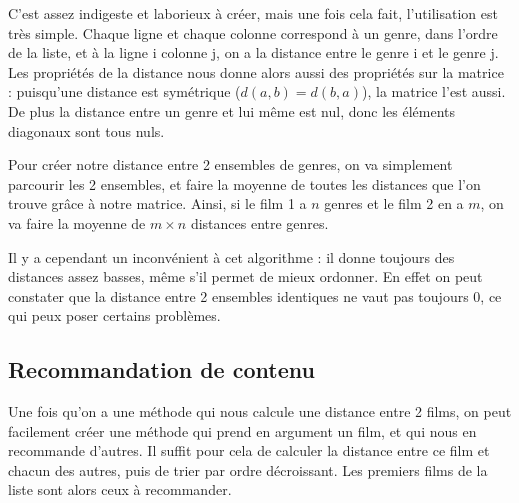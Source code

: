 \documentclass{report}
\begin{document}
\normalsize
C'est assez indigeste et laborieux à créer, mais une fois cela fait, l'utilisation est très simple. Chaque ligne et chaque colonne correspond à un genre, dans l'ordre de la liste, et à la ligne i colonne j, on a la distance entre le genre i et le genre j. Les propriétés de la distance nous donne alors aussi des propriétés sur la matrice : puisqu'une distance est symétrique (\(d(a,b)=d(b,a)\)), la matrice l'est aussi. De plus la distance entre un genre et lui même est nul, donc les éléments diagonaux sont tous nuls.\par
Pour créer notre distance entre 2 ensembles de genres, on va simplement parcourir les 2 ensembles, et faire la moyenne de toutes les distances que l'on trouve grâce à notre matrice. Ainsi, si le film 1 a $n$ genres et le film 2 en a $m$, on va faire la moyenne de $m\times n$ distances entre genres.\par
Il y a cependant un inconvénient à cet algorithme : il donne toujours des distances assez basses, même s'il permet de mieux ordonner. En effet on peut constater que la distance entre 2 ensembles identiques ne vaut pas toujours 0, ce qui peux poser certains problèmes.

\subsection{Recommandation de contenu}
Une fois qu'on a une méthode qui nous calcule une distance entre 2 films, on peut facilement créer une méthode qui prend en argument un film, et qui nous en recommande d'autres. Il suffit pour cela de calculer la distance entre ce film et chacun des autres, puis de trier par ordre décroissant. Les premiers films de la liste sont alors ceux à recommander.










\end{document}
